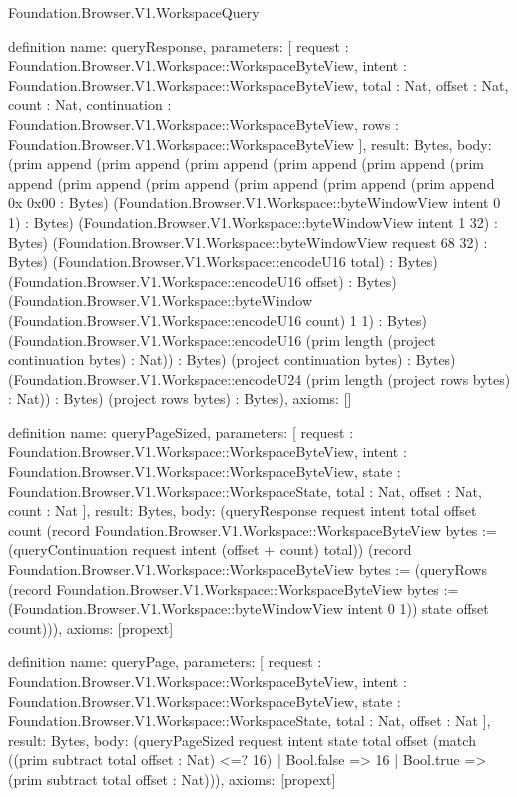 \begin{lexlean}{Foundation.Browser.V1.WorkspaceQuery}
\begin{semanticmodule}
definition{
  name: queryResponse,
  parameters: [
    request : Foundation.Browser.V1.Workspace::WorkspaceByteView,
    intent : Foundation.Browser.V1.Workspace::WorkspaceByteView,
    total : Nat,
    offset : Nat,
    count : Nat,
    continuation : Foundation.Browser.V1.Workspace::WorkspaceByteView,
    rows : Foundation.Browser.V1.Workspace::WorkspaceByteView
  ],
  result: Bytes,
  body: (prim append (prim append (prim append (prim append (prim append (prim append (prim append (prim append (prim append (prim append (prim append 0x 0x00 : Bytes) (Foundation.Browser.V1.Workspace::byteWindowView intent 0 1) : Bytes) (Foundation.Browser.V1.Workspace::byteWindowView intent 1 32) : Bytes) (Foundation.Browser.V1.Workspace::byteWindowView request 68 32) : Bytes) (Foundation.Browser.V1.Workspace::encodeU16 total) : Bytes) (Foundation.Browser.V1.Workspace::encodeU16 offset) : Bytes) (Foundation.Browser.V1.Workspace::byteWindow (Foundation.Browser.V1.Workspace::encodeU16 count) 1 1) : Bytes) (Foundation.Browser.V1.Workspace::encodeU16 (prim length (project continuation bytes) : Nat)) : Bytes) (project continuation bytes) : Bytes) (Foundation.Browser.V1.Workspace::encodeU24 (prim length (project rows bytes) : Nat)) : Bytes) (project rows bytes) : Bytes),
  axioms: []
}

definition{
  name: queryPageSized,
  parameters: [
    request : Foundation.Browser.V1.Workspace::WorkspaceByteView,
    intent : Foundation.Browser.V1.Workspace::WorkspaceByteView,
    state : Foundation.Browser.V1.Workspace::WorkspaceState,
    total : Nat,
    offset : Nat,
    count : Nat
  ],
  result: Bytes,
  body: (queryResponse request intent total offset count (record Foundation.Browser.V1.Workspace::WorkspaceByteView {bytes := (queryContinuation request intent (offset + count) total)}) (record Foundation.Browser.V1.Workspace::WorkspaceByteView {bytes := (queryRows (record Foundation.Browser.V1.Workspace::WorkspaceByteView {bytes := (Foundation.Browser.V1.Workspace::byteWindowView intent 0 1)}) state offset count)})),
  axioms: [propext]
}

definition{
  name: queryPage,
  parameters: [
    request : Foundation.Browser.V1.Workspace::WorkspaceByteView,
    intent : Foundation.Browser.V1.Workspace::WorkspaceByteView,
    state : Foundation.Browser.V1.Workspace::WorkspaceState,
    total : Nat,
    offset : Nat
  ],
  result: Bytes,
  body: (queryPageSized request intent state total offset (match ((prim subtract total offset : Nat) <=? 16)
    | Bool.false => 16
    | Bool.true => (prim subtract total offset : Nat))),
  axioms: [propext]
}


\end{semanticmodule}
\end{lexlean}
